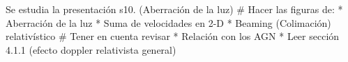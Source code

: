 Se estudia la presentación s10. (Aberración de la luz)
# Hacer las figuras de:
* Aberración de la luz
* Suma de velocidades en 2-D
* Beaming (Colimación) relativístico
# Tener en cuenta revisar
* Relación con los AGN
* Leer sección 4.1.1 (efecto doppler relativista general)
